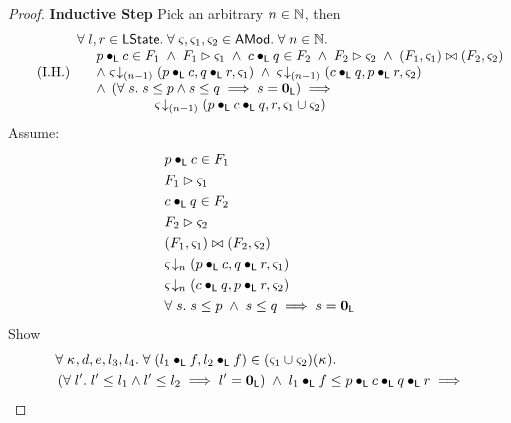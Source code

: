 \begin{lemma}[]
\begin{proof}
\noindent
\textbf{}
\textbf{Inductive Step} Pick an arbitrary $n \in \mathbb{N}$, then
%
\begin{equation}
	\tag{I.H.}
	\begin{array}{l}
		\forall\; l, r \in \textsf{LState}.\; \forall\; \varsigma_{}, \varsigma_{1}, \varsigma_{2} \in \textsf{AMod}.\; \forall\; n \in \mathbb{N}.\;\\
		\hspace*{0.5cm} p \bullet_{\textsf{L}} c \in F_1 \;\land\; F_1 \rhd \varsigma_{1} \;\land\; c \bullet_{\textsf{L}} q \in F_2 \;\land\; F_2 \rhd \varsigma_{2} \;\land\; (F_1, \varsigma_{1}) \bowtie (F_2, \varsigma_{2})\\
		\hspace*{0.5cm} \land\; \varsigma_{} \!\downarrow_{(n-1)} \left(p \bullet_{\textsf{L}} c, q \bullet_{\textsf{L}} r, \varsigma_{1}\right) \;\land\; \varsigma_{} \!\downarrow_{(n-1)} \left(c \bullet_{\textsf{L}} q, p \bullet_{\textsf{L}} r, \varsigma_{2}\right)\\
		\hspace*{0.5cm}\land\;\left( \forall\; s.\; s \leq p \land s \leq q \implies s = \mathbf{0}_{\textsf{L}} \right)
		\implies\\
		\hspace*{2cm} \varsigma_{} \!\downarrow_{(n-1)} \left(p \bullet_{\textsf{L}} c \bullet_{\textsf{L}} q, r, \varsigma_{1} \cup \varsigma_{2}\right)
	\end{array}
\label{LM:I.H}
\end{equation}
%
Assume:
%
\begin{align}
	& p \bullet_{\textsf{L}} c \in F_1 \label{LM:Ass1}\\
	& F_1 \rhd \varsigma_{1} \label{LM:Ass2}\\
	& c \bullet_{\textsf{L}} q \in F_2 \label{LM:Ass3}\\
	& F_2 \rhd \varsigma_{2} \label{LM:Ass4}\\
	& (F_1, \varsigma_{1}) \bowtie (F_2, \varsigma_{2}) \label{LM:Ass5}\\
	& \varsigma_{} \!\downarrow_{n} \left(p \bullet_{\textsf{L}} c, q \bullet_{\textsf{L}} r, \varsigma_{1}\right) \label{LM:Ass6}\\
	& \varsigma_{} \!\downarrow_{n} \left(c \bullet_{\textsf{L}} q, p \bullet_{\textsf{L}} r, \varsigma_{2}\right) \label{LM:Ass7}\\
	& \forall\; s.\; s \leq p \;\land\; s \leq q \implies s = \mathbf{0}_{\textsf{L}} \label{LM:Ass0}
\end{align}
%
Show
%
\begin{align}
	&\for{\ca{}, d, e, l_3, l_4}\for{(l_1 \composeL f, l_2 \composeL f) \in (\amod{1} \cup \amod{2})(\ca{})} \nonumber\\
	& \left(\for{l'} l' \leq l_1 \land l' \leq l_2 \implies l' = \unitL\right) \;\land\; l_1 \composeL f \leq  p \composeL c \composeL q \composeL r  \implies\nonumber\\

\end{align}
\end{proof}
\end{lemma}
